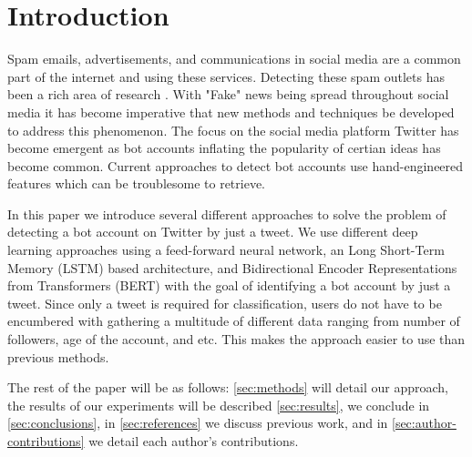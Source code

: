 \section{Introduction}
\label{sec:introduction}

Spam emails, advertisements, and communications in social media are a
common part of the internet and using these services. Detecting these
spam outlets has been a rich area of research
\citep{Cormack:2008:ESF:1454707.1454708,
DBLP:journals/corr/cs-CL-0009009, Androutsopoulos2006LearningTF,
Bickel:2006:DSF:2976456.2976477, Bratko:2006:SFU:1248547.1248644,
Solan:inproceedings, Cresci:2017:PSS:3041021.3055135, fameforsale2015,
INUWADUTSE2018496, FM2793, 8424744}.  With "Fake" news being spread
throughout social media \citep{NBERw25223} it has become imperative
that new methods and techniques be developed to address this
phenomenon. The focus on the social media platform Twitter has become
emergent \citep{8424744, FM2793, INUWADUTSE2018496,
Cresci:2017:PSS:3041021.3055135, fameforsale2015} as bot accounts
inflating the popularity of certian ideas has become common. Current
approaches to detect bot accounts use hand-engineered features which
can be troublesome to retrieve.

In this paper we introduce several different approaches to solve the
problem of detecting a bot account on Twitter by just a tweet. We use
different deep learning approaches using a feed-forward neural
network, an Long Short-Term Memory (LSTM) based architecture, and
Bidirectional Encoder Representations from Transformers (BERT) with
the goal of identifying a bot account by just a tweet. Since only a
tweet is required for classification, users do not have to be
encumbered with gathering a multitude of different data ranging from
number of followers, age of the account, and etc. This makes the
approach easier to use than previous methods.

The rest of the paper will be as follows: \cref{sec:methods} will
detail our approach, the results of our experiments will be described
\cref{sec:results}, we conclude in \cref{sec:conclusions}, in
\cref{sec:references} we discuss previous work, and in
\cref{sec:author-contributions} we detail each author's contributions.
